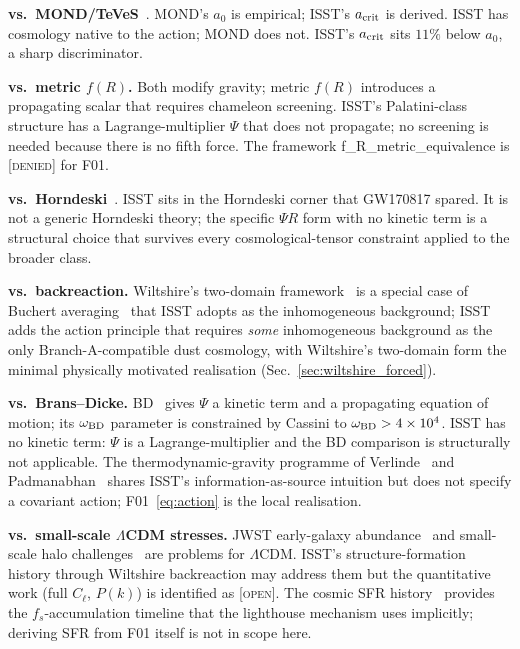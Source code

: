 \documentclass[aps,prd,twocolumn,nofootinbib,floatfix,superscriptaddress]{revtex4-2}
\newcommand{\OPEN}{{\color{black!60!red}\textsc{[open]}}}
\begin{document}
\textbf{vs.\ MOND/TeVeS}~\cite{Milgrom1983,Bekenstein1984,BekensteinTeVeS2004,SandersMcGaugh2002,FamaeyMcGaugh2012,BanikZhao2022}.
MOND's $a_0$ is empirical; ISST's $a_{\rm crit}$ is derived.
ISST has cosmology native to the action; MOND does not.
ISST's $a_{\rm crit}$ sits $11\%$ below $a_0$, a sharp discriminator.

\textbf{vs.\ metric $f(R)$.} Both modify gravity; metric $f(R)$
introduces a propagating scalar that requires chameleon
screening. ISST's Palatini-class structure has a Lagrange-multiplier
$\Psi$ that does not propagate; no screening is needed because
there is no fifth force. The framework
\textsf{f\_R\_metric\_equivalence} is \textsc{[denied]} for F01.

\textbf{vs.\ Horndeski}~\cite{Horndeski1974,Creminelli2017,LIGO2017,LIGOGW170817EM}.
ISST sits in the Horndeski corner that GW170817 spared. It is not a generic Horndeski theory; the
specific $\Psi R$ form with no kinetic term is a structural
choice that survives every cosmological-tensor constraint
applied to the broader class.

\textbf{vs.\ backreaction.} Wiltshire's two-domain
framework~\cite{Wiltshire2007,Wiltshire2009} is a special case of
Buchert averaging~\cite{Buchert2000,BuchertRasanen2008} that ISST
adopts as the inhomogeneous background; ISST adds the action
principle that requires \emph{some} inhomogeneous background as
the only Branch-A-compatible dust cosmology, with Wiltshire's
two-domain form the minimal physically motivated realisation
(Sec.~\ref{sec:wiltshire_forced}).

\textbf{vs.\ Brans--Dicke.} BD~\cite{BransDicke1961,OHanlonTupper1972,FujiiMaeda2003}
gives $\Psi$ a kinetic term and a propagating equation of motion;
its $\omega_{\rm BD}$ parameter is constrained by Cassini to
$\omega_{\rm BD} > 4\times 10^4$. ISST has no kinetic term: $\Psi$
is a Lagrange-multiplier and the BD comparison is structurally not
applicable. The thermodynamic-gravity programme of
Verlinde~\cite{Verlinde2011,Verlinde2017} and
Padmanabhan~\cite{Padmanabhan2010} shares ISST's information-as-source
intuition but does not specify a covariant action;
F01~\eqref{eq:action} is the local realisation.

\textbf{vs.\ small-scale $\Lambda$CDM stresses.} JWST early-galaxy
abundance~\cite{LabbeJWST2023} and small-scale halo
challenges~\cite{BullockBoylanKolchin2017,BoylanKolchin2023} are
problems for $\Lambda$CDM. ISST's structure-formation history
through Wiltshire backreaction may address them but the
quantitative work (full $C_\ell$, $P(k)$) is identified as
\OPEN. The cosmic SFR history~\cite{MadauDickinson2014} provides the
$f_s$-accumulation timeline that the lighthouse mechanism uses
implicitly; deriving SFR from F01 itself is not in scope here.
\end{document}

